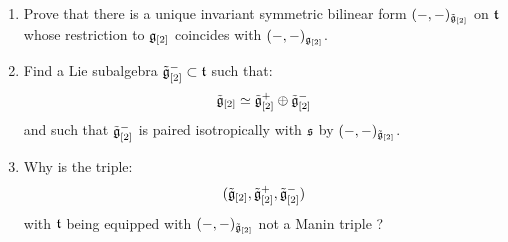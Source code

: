             \begin{question} \label{question: extending_invariant_inner_products_on_multi_loop_to_universal_central_extensions}
                \begin{enumerate}
                    \item Prove that there is a unique invariant symmetric bilinear form $(-, -)_{\tilde{\mathfrak{g}}_{[2]}}$ on $\mathfrak{t}$ whose restriction to $\mathfrak{g}_{[2]}$ coincides with $(-, -)_{\mathfrak{g}_{[2]}}$.
                    \item Find a Lie subalgebra $\tilde{\mathfrak{g}}_{[2]}^- \subset \mathfrak{t}$ such that:
                        $$\tilde{\mathfrak{g}}_{[2]}\simeq \tilde{\mathfrak{g}}_{[2]}^+\oplus \tilde{\mathfrak{g}}_{[2]}^-$$
                    and such that $\tilde{\mathfrak{g}}_{[2]}^-$ is paired isotropically with $\mathfrak{s}$ by $(-, -)_{\tilde{\mathfrak{g}}_{[2]}}$. 
                    \item Why is the triple:
                        $$(\tilde{\mathfrak{g}}_{[2]}, \tilde{\mathfrak{g}}_{[2]}^+, \tilde{\mathfrak{g}}_{[2]}^-)$$
                    with $\mathfrak{t}$ being equipped with $(-, -)_{\tilde{\mathfrak{g}}_{[2]}}$ not a Manin triple ?
                \end{enumerate}
            \end{question}
